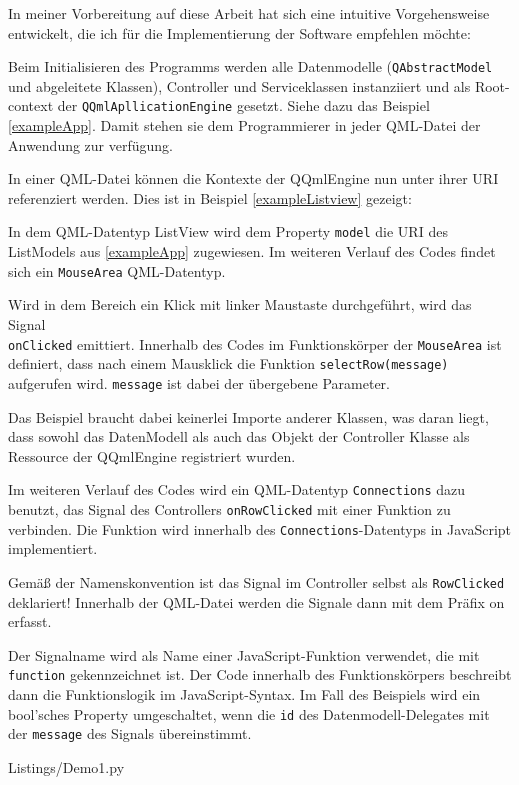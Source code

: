 In meiner Vorbereitung auf diese Arbeit hat sich eine intuitive Vorgehensweise entwickelt, die ich für die Implementierung
der Software empfehlen möchte:

Beim Initialisieren des Programms werden alle Datenmodelle (\verb|QAbstractModel| und abgeleitete Klassen), Controller
und Serviceklassen instanziiert und als Root-context der \verb|QQmlApllicationEngine| gesetzt.
Siehe dazu das Beispiel \ref{exampleApp}.
Damit stehen sie dem Programmierer in jeder QML-Datei der Anwendung zur verfügung.

In einer QML-Datei können die Kontexte der QQmlEngine nun unter ihrer URI referenziert werden.
Dies ist in Beispiel \ref{exampleListview} gezeigt:

In dem QML-Datentyp \glqq ListView\grqq{} wird dem Property \verb|model| die URI des ListModels aus \ref{exampleApp} zugewiesen.
Im weiteren Verlauf des Codes findet sich ein \verb|MouseArea| QML-Datentyp.

Wird in dem Bereich ein Klick mit linker Maustaste durchgeführt, wird das Signal \\\verb|onClicked| emittiert.
Innerhalb des Codes im Funktionskörper der \verb|MouseArea| ist definiert, dass nach einem Mausklick die Funktion \verb|selectRow(message)|
aufgerufen wird. \verb|message| ist dabei der übergebene Parameter.

Das Beispiel braucht dabei keinerlei Importe anderer Klassen, was daran liegt, dass sowohl das DatenModell als
auch das Objekt der Controller Klasse als Ressource der QQmlEngine registriert wurden.

Im weiteren Verlauf des Codes wird ein QML-Datentyp \verb|Connections| dazu benutzt, das Signal des Controllers \verb|onRowClicked|
mit einer Funktion zu verbinden.
Die Funktion wird innerhalb des \verb|Connections|-Datentyps in JavaScript implementiert.

Gemäß der Namenskonvention ist das Signal im Controller selbst als \verb|RowClicked| deklariert!
Innerhalb der QML-Datei werden die Signale dann mit dem Präfix \glqq on\grqq{} erfasst.

Der Signalname wird als Name einer JavaScript-Funktion verwendet, die mit \verb|function| gekennzeichnet ist.
Der Code innerhalb des Funktionskörpers beschreibt dann die Funktionslogik im JavaScript-Syntax.
Im Fall des Beispiels wird ein bool'sches Property umgeschaltet, wenn die \verb|id| des Datenmodell-Delegates mit der
\verb|message| des Signals übereinstimmt.

\lstset{
    basicstyle=\small\ttfamily
}
\newpage

{Listings/Demo1.py}\label{exampleApp}

